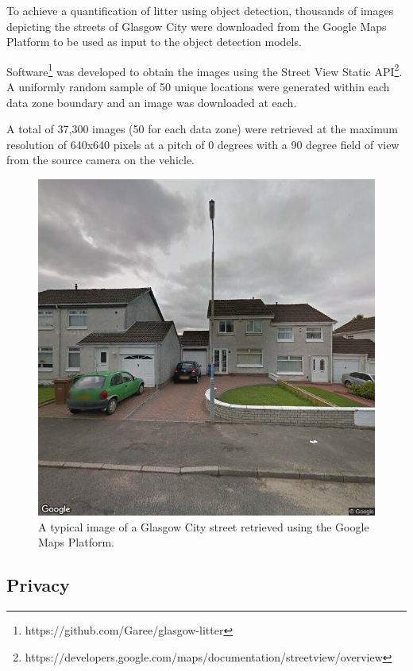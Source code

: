 \documentclass{thesis}
\begin{document}
To achieve a quantification of litter using object detection, thousands of images depicting the streets of Glasgow City were downloaded from the Google Maps Platform to be used as input to the object detection models. 

Software\footnote{https://github.com/Garee/glasgow-litter} was developed to obtain the images using the Street View Static API\footnote{https://developers.google.com/maps/documentation/streetview/overview}. A uniformly random sample of 50 unique locations were generated within each data zone boundary and an image was downloaded at each.

A total of 37,300 images (50 for each data zone) were retrieved at the maximum resolution of 640x640 pixels at a pitch of 0 degrees with a 90 degree field of view from the source camera on the vehicle.

\begin{figure}[h]
    \centering
    \includegraphics[scale=0.4]{images/street-view-image.jpg}
    \caption{A typical image of a Glasgow City street retrieved using the Google Maps Platform.}
    \label{fig:street-view-image}
\end{figure}

\subsection*{Privacy}
\end{document}
